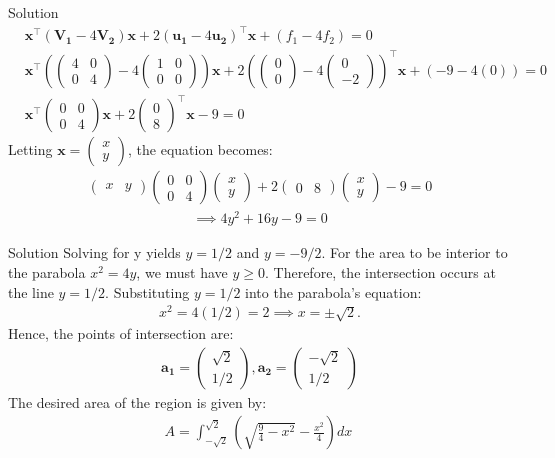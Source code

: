 \documentclass{beamer}
\newcommand{\myvec}[1]{\ensuremath{\begin{pmatrix}#1\end{pmatrix}}}
\begin{document}
\begin{frame}{Solution}
 \begin{align} 
 	&\mathbf{x}^\top( \mathbf{V_1} - 4\mathbf{V_2} )\mathbf{x} + 2( \mathbf{u_1} - 4\mathbf{u_2} )^\top\mathbf{x} + ( f_1 - 4f_2 ) = 0 \\
 	&\mathbf{x}^\top\left( \myvec{4 & 0 \\ 0 & 4} - 4\myvec{1 & 0 \\ 0 & 0} \right)\mathbf{x} + 2\left( \myvec{0 \\ 0} - 4\myvec{0 \\ -2} \right)^\top\mathbf{x} + ( -9 - 4(0) ) = 0 \\
 	&\mathbf{x}^\top \myvec{0 & 0 \\ 0 & 4} \mathbf{x} + 2 \myvec{0 \\ 8}^\top \mathbf{x} - 9 = 0 
 \end{align}
 Letting $\mathbf{x} = \myvec{x \\ y}$, the equation becomes:
 \begin{align} \myvec{x & y} \myvec{0 & 0 \\ 0 & 4} \myvec{x \\ y} + 2 \myvec{0 & 8} \myvec{x \\ y} - 9 = 0 \end{align}
 \begin{align} \implies 4y^2 + 16y - 9 = 0 \end{align}
\end{frame}

\begin{frame}{Solution}
Solving for y yields $y = 1/2$ and $y = -9/2$. For the area to be interior to the parabola $x^2 = 4y$, we must have $y \ge 0$. Therefore, the intersection occurs at the line $y = 1/2$. Substituting $y = 1/2$ into the parabola's equation:
\begin{align} x^2 = 4(1/2) = 2 \implies x = \pm\sqrt{2}. \end{align}
Hence, the points of intersection are:
\begin{align} 
	\mathbf{a_1} = \myvec{\sqrt{2} \\ 1/2}, \mathbf{a_2} = \myvec{-\sqrt{2} \\ 1/2}
\end{align}
The desired area of the region is given by:
\begin{align} A = \int_{-\sqrt{2}}^{\sqrt{2}} \left( \sqrt{\frac{9}{4} - x^2} - \frac{x^2}{4} \right) dx \
\end{align}
\end{frame}
\end{document}
